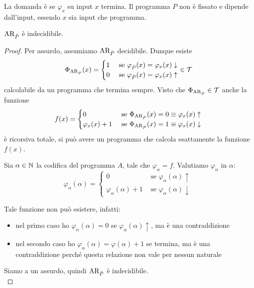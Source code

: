 La domanda è se $\varphi_x$ su input $x$ termina. Il programma $P$ non è fissato e dipende dall'input, essendo $x$ sia input che programma.\\

\begin{theor}
	$\text{AR}_{\hat{P}}$ è indecidibile.
\end{theor}
\begin{proof}
	Per assurdo, assumiamo $\text{AR}_{\hat{P}}$ decidibile. Dunque esiste
	$$
	\Phi_{\text{AR}_{\hat{P}}} (x) = \begin{cases}
		1 & \text{ se } \varphi_{\hat{P}} (x) = \varphi_x (x) \downarrow \\
		0 & \text{ se } \varphi_{\hat{P}} (x) = \varphi_x (x) \uparrow \\
	\end{cases}
	\in \mathcal{T}
	$$
	calcolabile da un programma che termina sempre. Visto che $\Phi_{\text{AR}_{\hat{P}}} \in \mathcal{T}$ anche la funzione
	$$
	f(x) = \begin{cases}
		0 & \text{ se } \Phi_{\text{AR}_{\hat{P}}} (x) = 0 \equiv \varphi_x (x) \uparrow \\
		\varphi_x (x) + 1 & \text{ se } \Phi_{\text{AR}_{\hat{P}}} (x) = 1 \equiv \varphi_x (x) \downarrow
	\end{cases}
	$$
	è ricorsiva totale, si può avere un programma che calcola esattamente la funzione $f(x)$.

	Sia $\alpha \in \mathbb{N}$ la codifica del programma $A$, tale che $\varphi_\alpha = f$.  Valutiamo $\varphi_\alpha$ in $\alpha$:
	$$
	\varphi_\alpha (\alpha) = \begin{cases}
		0 & \text{ se } \varphi_\alpha (\alpha) \uparrow \\
		\varphi_\alpha (\alpha) + 1 & \text{ se } \varphi_\alpha(\alpha) \downarrow
	\end{cases}
	$$

	Tale funzione non può esistere, infatti:
	\begin{itemize}
		\item nel primo caso ho $\varphi_\alpha (\alpha) = 0$ se $\varphi_\alpha(\alpha) \uparrow$, ma è una contraddizione
		\item nel secondo caso ho $\varphi_\alpha (\alpha) = \varphi(\alpha) + 1$ se termina, ma è una contraddizione perché questa relazione non vale per nessun naturale
	\end{itemize}

	Siamo a un assurdo, quindi $\text{AR}_{\hat{P}}$ è indecidibile. \\
\end{proof}

